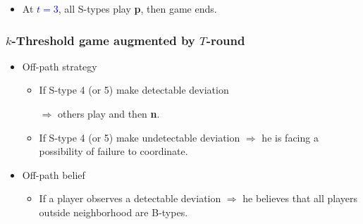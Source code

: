 \documentclass[10pt]{beamer}
\begin{document}
\begin{frame}
\begin{itemize}
\begin{itemize}
\pause
\item At \textcolor{blue}{$t=3$}, all S-types play \textbf{p}, then game ends.

\end{itemize}

\end{itemize}



\end{frame}


\begin{frame}
  \frametitle{$k$-Threshold game augmented by $T$-round }


\begin{itemize}

\item Off-path strategy
\begin{itemize}
\item If S-type 4 (or 5) make detectable deviation 

$\Rightarrow$ others play  and then \textbf{n}.
\item If S-type 4 (or 5) make undetectable deviation $\Rightarrow$ he is facing a possibility of failure to coordinate.
\end{itemize}
\item Off-path belief
\begin{itemize}
\item If a player observes a detectable deviation $\Rightarrow$ he believes that all players outside neighborhood are B-types. 
\end{itemize}
\end{itemize}



\end{frame}
\end{document}
